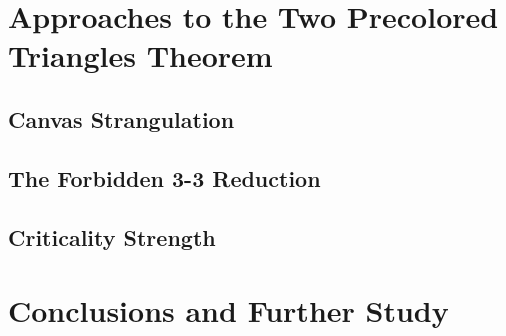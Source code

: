 \documentclass{article}
\theoremstyle{definition}
\begin{document}
\newpage


\newpage

\tableofcontents

\newpage











\section{Approaches to the Two Precolored Triangles Theorem}

\subsection{Canvas Strangulation}

\subsection{The Forbidden 3-3 Reduction}

\subsection{Criticality Strength}


\section{Conclusions and Further Study}

\newpage

\printbibliography
\end{document}
